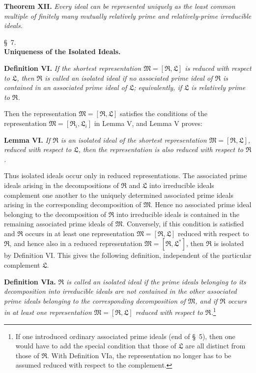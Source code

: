 \documentclass[11pt]{article}
\providecommand{\ideal}[1]{\mathfrak{#1}}
\begin{document}
\textbf{Theorem XII.} \emph{Every ideal can be represented uniquely as the least common multiple of finitely many mutually relatively prime and relatively-prime irreducible ideals.}

\begin{center}
\S~7.\\[0.25em]
\textbf{Uniqueness of the Isolated Ideals.}
\end{center}

\textbf{Definition VI.} \emph{If the shortest representation $\ideal M=[\ideal R,
\ideal L]$ is reduced with respect to $\ideal L$, then $\ideal R$ is called an isolated ideal if no associated prime ideal of $\ideal R$ is contained in an associated prime ideal of $\ideal L$; equivalently, if $\ideal L$ is relatively prime to $\ideal R$.}

Then the representation $\ideal M=[\ideal R,
\ideal L]$ satisfies the conditions of the representation $\ideal M=[\ideal R_i,
\ideal L_i]$ in Lemma V, and Lemma V proves:

\textbf{Lemma VI.} \emph{If $\ideal R$ is an isolated ideal of the shortest representation $\ideal M=[\ideal R,
\ideal L]$, reduced with respect to $\ideal L$, then the representation is also reduced with respect to $\ideal R$.}

Thus isolated ideals occur only in reduced representations. The associated prime ideals arising in the decompositions of $\ideal R$ and $\ideal L$ into irreducible ideals complement one another to the uniquely determined associated prime ideals arising in the corresponding decomposition of $\ideal M$. Hence no associated prime ideal belonging to the decomposition of $\ideal R$ into irreducible ideals is contained in the remaining associated prime ideals of $\ideal M$. Conversely, if this condition is satisfied and $\ideal R$ occurs in at least one representation $\ideal M=[\ideal R,
\ideal L]$ reduced with respect to $\ideal R$, and hence also in a reduced representation $\ideal M=[\ideal R,
\ideal L^*]$, then $\ideal R$ is isolated by Definition VI. This gives the following definition, independent of the particular complement $\ideal L$.

\textbf{Definition VIa.} \emph{$\ideal R$ is called an isolated ideal if the prime ideals belonging to its decomposition into irreducible ideals are not contained in the other associated prime ideals belonging to the corresponding decomposition of $\ideal M$, and if $\ideal R$ occurs in at least one representation $\ideal M=[\ideal R,
\ideal L]$ reduced with respect to $\ideal R$.}\footnote{If one introduced ordinary associated prime ideals (end of \S~5), then one would have to add the special condition that those of $\ideal L$ are all distinct from those of $\ideal R$. With Definition VIa, the representation no longer has to be assumed reduced with respect to the complement.}
\end{document}
